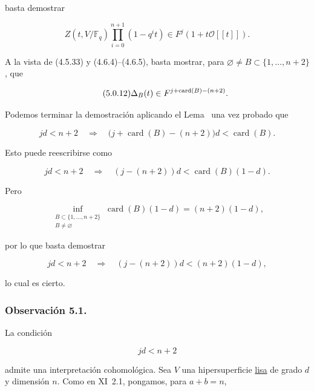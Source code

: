 basta demostrar

\begin{equation}\tag{5.0.11}
Z(t,V/\mathbb F_q)\prod_{i=0}^{n+1}(1-q^it)
\in F^j(1+t\mathcal O[[t]]).
\end{equation}

A la vista de (4.5.33) y (4.6.4)--(4.6.5), basta mostrar, para
$\varnothing\ne B\subset\{1,\ldots,n+2\}$, que

\begin{equation}\tag{5.0.12}
\sisi{\Lambda_B}{\Delta_B}(t)\in F^{j+\operatorname{card}(B)-(n+2)}.
\end{equation}

Podemos terminar la demostración aplicando el
Lema~ una vez probado que

\begin{equation}\tag{5.0.13}
jd<n+2
\quad\Longrightarrow\quad
\bigl(j+\operatorname{card}(B)-(n+2)\bigr)d
<\operatorname{card}(B).
\end{equation}

Esto puede reescribirse como

\pageoriginale

\begin{equation}\tag{5.0.14}
jd<n+2
\quad\Longrightarrow\quad
(j-(n+2))d<\operatorname{card}(B)(1-d).
\end{equation}

Pero

\[
\inf_{\substack{B\subset\{1,\ldots,n+2\}\\B\ne\varnothing}}
\operatorname{card}(B)(1-d)
=(n+2)(1-d),
\]

por lo que basta demostrar

\begin{equation}\tag{5.0.15}
jd<n+2
\quad\Longrightarrow\quad
(j-(n+2))d<(n+2)(1-d),
\end{equation}

lo cual es cierto.

\subsubsection*{Observación 5.1.}
La condición

\begin{equation}\tag{5.1.1}
jd<n+2
\end{equation}

admite una interpretación cohomológica. Sea $V$ una hipersuperficie \underline{lisa}
de grado $d$ y dimensión $n$. Como en XI~2.1, pongamos, para $a+b=n$,

